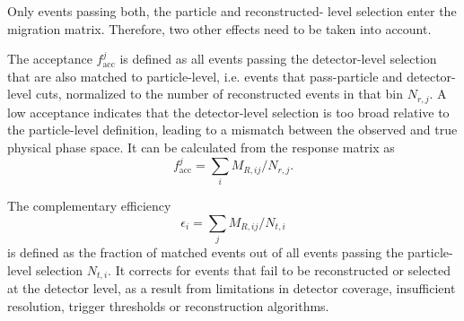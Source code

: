 Only events passing both, the particle and reconstructed-
level selection enter the migration matrix. Therefore, two other effects need to be taken into account.

The acceptance $f^j_\text{acc}$ is defined as all events passing the detector-level selection that are also matched to particle-level, i.e. events that pass-particle and detector-level cuts, normalized to the number of reconstructed events in that bin $N_{r,j}$. A low acceptance indicates that the detector-level selection is too broad relative to the particle-level definition, leading to a mismatch between the observed and true physical phase space.
It can be calculated from the response matrix as 
\begin{equation}
    \label{eq:acc}
    f^j_\text{acc} = \sum_i M_{R,ij}/N_{r,j}.
\end{equation}

The complementary efficiency 
\begin{equation}
    \label{eq:eff}
    \epsilon_i = \sum_j M_{R,ij}/N_{t,i}
\end{equation}
is defined as the fraction of matched events out of all events passing the particle-level 
selection $N_{t,i}$. It corrects for events that fail to be reconstructed or selected at the detector
level, as a result from limitations in detector coverage, insufficient resolution,
trigger thresholds or reconstruction algorithms.



